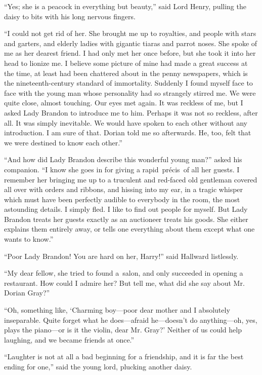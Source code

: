 “Yes; she is a peacock in everything but beauty,” said Lord Henry, pulling the daisy to bits with his long nervous fingers.

“I could not get rid of her. She brought me up to royalties, and people with stars and garters, and elderly ladies with gigantic tiaras and parrot noses. She spoke of me as her dearest friend. I had only met her once before, but she took it into her head to lionize me. I believe some picture of mine had made a great success at the time, at least had been chattered about in the penny newspapers, which is the nineteenth-century standard of immortality. Suddenly I found myself face to face with the young man whose personality had so strangely stirred me. We were quite close, almost touching. Our eyes met again. It was reckless of me, but I asked Lady Brandon to introduce me to him. Perhaps it was not so reckless, after all. It was simply inevitable. We would have spoken to each other without any introduction. I am sure of that. Dorian told me so afterwards. He, too, felt that we were destined to know each other.”

“And how did Lady Brandon describe this wonderful young man?” asked his companion. “I know she goes in for giving a rapid précis of all her guests. I remember her bringing me up to a truculent and red-faced old gentleman covered all over with orders and ribbons, and hissing into my ear, in a tragic whisper which must have been perfectly audible to everybody in the room, the most astounding details. I simply fled. I like to find out people for myself. But Lady Brandon treats her guests exactly as an auctioneer treats his goods. She either explains them entirely away, or tells one everything about them except what one wants to know.”

“Poor Lady Brandon! You are hard on her, Harry!” said Hallward listlessly.

“My dear fellow, she tried to found a salon, and only succeeded in opening a restaurant. How could I admire her? But tell me, what did she say about Mr. Dorian Gray?”

“Oh, something like, ‘Charming boy—poor dear mother and I absolutely inseparable. Quite forget what he does—afraid he—doesn’t do anything—oh, yes, plays the piano—or is it the violin, dear Mr. Gray?’ Neither of us could help laughing, and we became friends at once.”

“Laughter is not at all a bad beginning for a friendship, and it is far the best ending for one,” said the young lord, plucking another daisy.

